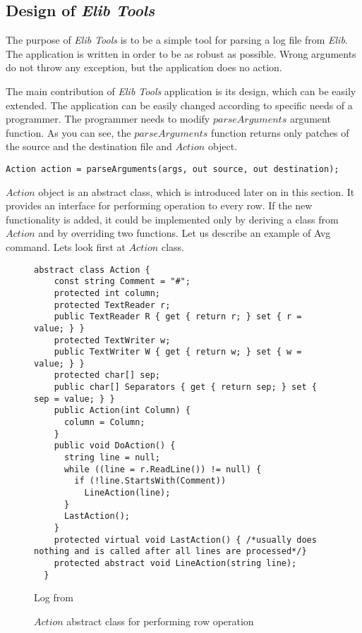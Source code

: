 \subsection*{Design of {\it Elib Tools}}\label{sec:design}
	The purpose of {\it Elib Tools} is to be a simple tool for parsing a log file from {\it Elib}.
	The application is written in order to be as robust as possible.
	Wrong arguments do not throw any exception, but the application does no action.

	The main contribution of {\it Elib Tools} application is its design, which can be easily extended.
	The application can be easily changed according to specific needs of a programmer.
	The programmer needs to modify $parseArguments$ argument function.
	As you can see, the $parseArguments$ function returns only patches 
	of the source and the destination file and $Action$ object.
\begin{lstlisting}
Action action = parseArguments(args, out source, out destination);
\end{lstlisting}
	
	$Action$ object is an abstract class, which is introduced later on in this section. It provides
	an interface for performing operation to every row.
	If the new functionality is added, it could be implemented only by deriving 
	a class from $Action$ and by overriding
	two functions. Let us describe an example of Avg command. Lets look first at $Action$ class.
\begin{figure}[!hbp]
\begin{lstlisting}
abstract class Action {
    const string Comment = "#";
    protected int column;
    protected TextReader r;
    public TextReader R { get { return r; } set { r = value; } }
    protected TextWriter w;
    public TextWriter W { get { return w; } set { w = value; } }
    protected char[] sep;
    public char[] Separators { get { return sep; } set { sep = value; } }
    public Action(int Column) {
      column = Column;
    }
    public void DoAction() {
      string line = null;
      while ((line = r.ReadLine()) != null) {
        if (!line.StartsWith(Comment))
          LineAction(line);
      }
      LastAction();
    }
    protected virtual void LastAction() { /*usually does nothing and is called after all lines are processed*/}
    protected abstract void LineAction(string line);
  }
\end{lstlisting}

	Log from 
\caption{$Action$ abstract class for performing row operation}\label{action}
\end{figure}

